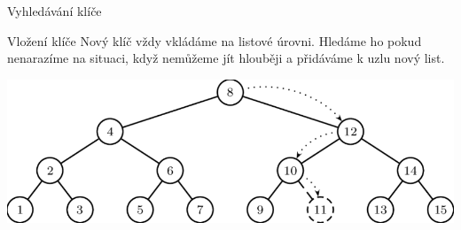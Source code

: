 \documentclass[10pt]{beamer}
\begin{document}
\begin{frame}[t]{Vyhledávání klíče}
{\begin{center}
    \end{center}
    }
\end{frame}

\begin{frame}[t]{Vložení klíče}
    \bigskip
    Nový klíč vždy vkládáme na listové úrovni. Hledáme ho pokud nenarazíme na situaci, když nemůžeme jít hlouběji a přidáváme k uzlu nový list.
    \bigskip
    \begin{center}
        \includegraphics[scale=0.35]{strom.png}
    \end{center}
\end{frame}
\end{document}
